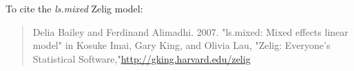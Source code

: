 To cite the \emph{ ls.mixed } Zelig model:
 \begin{verse}
 Delia Bailey and Ferdinand Alimadhi. 2007. "ls.mixed: Mixed effects linear model" in Kosuke Imai, Gary King, and Olivia Lau, "Zelig: Everyone's Statistical Software,"\url{http://gking.harvard.edu/zelig} 
\end{verse}